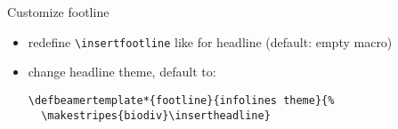 \documentclass[aspectratio=169]{beamer}
\begin{document}
\begin{frame}[fragile]{Customize footline}
  \begin{itemize}
    \item redefine \Verb|\insertfootline| like for headline (default: empty macro)
    \item change headline theme, default to:
      \begin{Verbatim}[fontsize=\relsize{-2}]
\defbeamertemplate*{footline}{infolines theme}{%
  \makestripes{biodiv}\insertheadline}
      \end{Verbatim}
  \end{itemize}
\end{frame}
\end{document}
